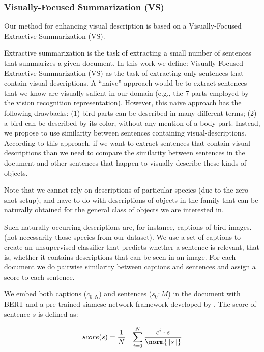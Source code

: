 \documentclass[11pt,a4paper]{article}
\begin{document}
\subsubsection{Visually-Focused Summarization (VS)}


Our method for enhancing visual description is based on a Visually-Focused Extractive Summarization (VS).

Extractive summarization is the task of extracting a small number of sentences that summarizes a given document.
In this work we define: Visually-Focused Extractive Summarization (VS) as the task of extracting only sentences that contain visual-descriptions. A \enquote{naive} approach would be to extract sentences that we know are visually salient in our domain (e.g., the 7 parts employed by the vision recognition representation).  However, this naive approach has the following drawbacks: (1) bird parts can be described in many different terms; (2) a bird can be described by its color, without any mention of a body-part. 
Instead, we propose to use similarity between sentences containing visual-descriptions. According to this approach, if we want to extract sentences that contain visual-descriptions than we need to compare the similarity between sentences in the document and other sentences that happen to visually describe these kinds of objects. 
\par
Note that we cannot rely on descriptions of particular species (due to the zero-shot setup), and have to do with descriptions of objects in the family that can be naturally obtained for the general class of objects we are interested in.\par

Such naturally occurring descriptions are, for instance, captions of bird images. (not necessarily those species from our dataset). We use a set of captions to create an unsupervised classifier that predicts whether a sentence is relevant, that is, whether it contains descriptions that can be seen in an image.
For each document we do pairwise similarity between captions and sentences and assign a score to each sentence.

We embed both captions ($c_{0:N}$) and sentences ($s_0:M$) in the document with BERT \cite{devlin2018bert} and a pre-trained siamese network framework developed by \citet{reimers2019sentence}. The score of sentence $s$ is defined as:

\begin{equation}
\begin{aligned}
\begin{split}
\label{eq:score}
&score(s)=  \frac{1}{N}
&\sum_{i=0}^{N} \frac{c^i\cdot s}{ \norm{\| s\| }}
\end{split}
\end{aligned}
\end{equation}
\end{document}
